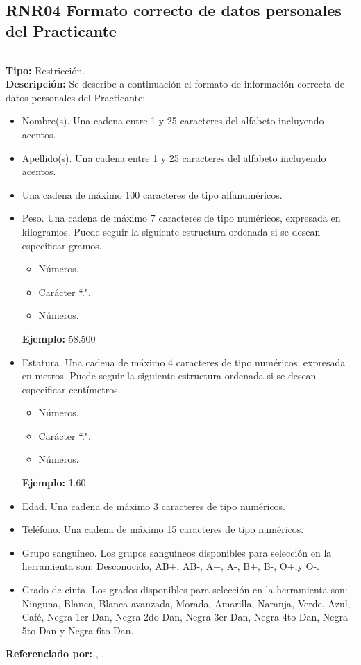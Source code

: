 \subsection{\normalsize{\textcolor[rgb]{0, 0, 0.545098}{RNR04 Formato correcto de datos personales del Practicante}}}
\label{rn:RNR04}
\rule[3mm]{16.59cm}{0.1mm} \vspace{1mm}
\textbf{Tipo:} Restricción.\\
\textbf{Descripción:} Se describe a continuación el formato de información correcta de datos personales del Practicante:
\begin{itemize} \itemsep1pt \parskip0pt 
	\item Nombre(s). Una cadena entre 1 y 25 caracteres del alfabeto incluyendo acentos.
	\item Apellido(s). Una cadena entre 1 y 25 caracteres del alfabeto incluyendo acentos.
	\item Una cadena de máximo 100 caracteres de tipo alfanuméricos.
	\item Peso. Una cadena de máximo 7 caracteres de tipo numéricos, expresada en kilogramos. Puede seguir la siguiente estructura ordenada si se desean especificar gramos.
	\begin{itemize} \itemsep1pt \parskip0pt 
		\item Números.
		\item Carácter ``.".
		\item Números.
	\end{itemize}
	\textbf{Ejemplo:} 58.500
	\item Estatura. Una cadena de máximo 4 caracteres de tipo numéricos, expresada en metros. Puede seguir la siguiente estructura ordenada si se desean especificar centímetros.
	\begin{itemize} \itemsep1pt \parskip0pt 
		\item Números.
		\item Carácter ``.".
		\item Números.
	\end{itemize}
	\textbf{Ejemplo:} 1.60
	\item Edad. Una cadena de máximo 3 caracteres de tipo numéricos.
	\item Teléfono. Una cadena de máximo 15 caracteres de tipo numéricos. 
	\item Grupo sanguíneo. Los grupos sanguíneos disponibles para selección en la herramienta son:  Desconocido, AB+, AB-, A+, A-, B+, B-, O+,y O-.
	\item Grado de cinta. Los grados disponibles para selección en la herramienta son: Ninguna, Blanca, Blanca avanzada, Morada, Amarilla, Naranja, Verde, Azul, Café, Negra 1er Dan, Negra 2do Dan, Negra 3er Dan, Negra 4to Dan, Negra 5to Dan y Negra 6to Dan.
\end{itemize}
\textbf{Referenciado por: } ,  .\\

